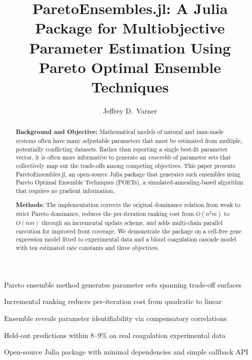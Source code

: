 \documentclass[preprint,review,12pt]{elsarticle}
\begin{document}
\begin{frontmatter}

\title{ParetoEnsembles.jl: A Julia Package for Multiobjective Parameter Estimation Using Pareto Optimal Ensemble Techniques}

\author[cornell]{Jeffrey D.\ Varner}
\address[cornell]{Robert Frederick Smith School of Chemical and Biomolecular Engineering, Cornell University, Ithaca, NY 14853, USA}

\begin{highlights}
\item Pareto ensemble method generates parameter sets spanning trade-off surfaces
\item Incremental ranking reduces per-iteration cost from quadratic to linear
\item Ensemble reveals parameter identifiability via compensatory correlations
\item Held-out predictions within 8--9\% on real coagulation experimental data
\item Open-source Julia package with minimal dependencies and simple callback API
\end{highlights}

\begin{abstract}
\textbf{Background and Objective:}
Mathematical models of natural and man-made systems often have many adjustable parameters that must be estimated from multiple, potentially conflicting datasets.
Rather than reporting a single best-fit parameter vector, it is often more informative to generate an \emph{ensemble} of parameter sets that collectively map out the trade-offs among competing objectives.
This paper presents ParetoEnsembles.jl, an open-source Julia package that generates such ensembles using Pareto Optimal Ensemble Techniques (POETs), a simulated-annealing-based algorithm that requires no gradient information.

\textbf{Methods:}
The implementation corrects the original dominance relation from weak to strict Pareto dominance, reduces the per-iteration ranking cost from $O(n^2 m)$ to $O(nm)$ through an incremental update scheme, and adds multi-chain parallel execution for improved front coverage.
We demonstrate the package on a cell-free gene expression model fitted to experimental data and a blood coagulation cascade model with ten estimated rate constants and three objectives.


\end{abstract}
\end{frontmatter}
\end{document}
